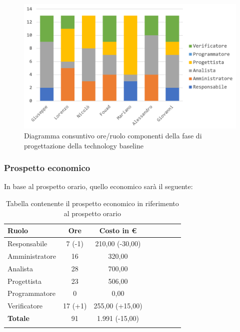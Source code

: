 			\begin{figure}[H]
				\centering
				\includegraphics[width=0.8\linewidth]{images/consuntivo/ConsCorrez1.png}
				\caption{Diagramma consuntivo ore/ruolo componenti della fase di progettazione della technology baseline}
				\label{fig:consuntivo diagramma suddivione ruoli fase di progettazione della technology baseline}
			\end{figure}
		\pagebreak
			
		\subsubsection{Prospetto economico}
			In base al prospetto orario, quello economico sarà il seguente: 
			
			\begin{longtable}{|l|c|c|c|c|c|c|c}
				\hline
				\rowcolor{lighter-grayer}
				\textbf{Ruolo} & \textbf{Ore} & \textbf{Costo in €} \\
				\hline
				\endfirsthead
				\hline
				Responsabile 	    & 7 (-1) & 210,00 (-30,00)\\
				\hline 
				\hline
				Amministratore	  & 16 & 320,00\\
				\hline
				\hline
				Analista 				& 28 & 700,00\\
				\hline
				\hline
				Progettista 		  & 23 & 506,00\\
				\hline
				\hline
				Programmatore 	 & 0 & 0,00\\
				\hline
				\hline
				Verificatore 		  & 17 (+1) & 255,00 (+15,00)\\
				\hline
				\textbf{Totale} 	& 91 & 1.991 (-15,00)\\
				\hline
				
				\caption{Tabella contenente il prospetto economico in riferimento al prospetto orario}
			\end{longtable}
			
